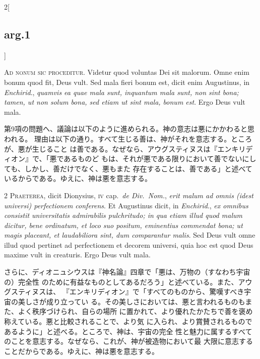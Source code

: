 \documentclass[paper=a4paper,fontsize=10pt,jafontsize=9pt,titlepage]{jlreq}
\begin{document}
\begin{paracol}{2}[\subsection{arg.1}]


{\huge A}{\scshape d nonum sic proceditur}. Videtur quod
voluntas Dei sit malorum. Omne enim bonum quod fit, Deus vult. Sed mala
fieri bonum est, dicit enim Augustinus, in {\itshape Enchirid}., {\itshape quamvis ea quae
mala sunt, inquantum mala sunt, non sint bona; tamen, ut non solum bona,
sed etiam ut sint mala, bonum est}. Ergo Deus vult mala.

\switchcolumn

第9項の問題へ、議論は以下のように進められる。神の意志は悪にかかわると思われる。
理由は以下の通り。すべて生じる善は、神がそれを意志する。ところが、悪が生じること
は善である。なぜなら、アウグスティヌスは『エンキリディオン』で、「悪であるものど
もは、それが悪である限りにおいて善でないにしても、しかし、善だけでなく、悪もまた
存在することは、善である」と述べているからである。ゆえに、神は悪を意志する。



{\scshape 2 Praeterea}, dicit Dionysius, {\scshape iv} cap.~{\itshape de
Div.~Nom.}, {\itshape erit malum ad omnis (idest universi) perfectionem
conferens}. Et Augustinus dicit, in {\itshape Enchirid}., {\itshape ex omnibus consistit
universitatis admirabilis pulchritudo; in qua etiam illud quod malum
dicitur, bene ordinatum, et loco suo positum, eminentius commendat bona;
ut magis placeant, et laudabiliora sint, dum comparantur malis}. Sed Deus
vult omne illud quod pertinet ad perfectionem et decorem universi, quia
hoc est quod Deus maxime vult in creaturis. Ergo Deus vult mala.

\switchcolumn

さらに、ディオニュシウスは『神名論』四章で「悪は、万物の（すなわち宇宙の）完全性
 のために有益なものとしてあるだろう」と述べている。また、アウグスティヌスは、
 『エンキリディオン』で「すべてのものから、驚嘆すべき宇宙の美しさが成り立ってい
 る。その美しさにおいては、悪と言われるものもまた、よく秩序づけられ、自らの場所
 に置かれて、より優れたかたちで善を褒め称えている。悪と比較されることで、より気
 に入られ、より賞賛されるものであるように」と述べる。ところで、神は、宇宙の完全
 性と魅力に属するすべてのことを意志する。なぜなら、これが、神が被造物において最
 大限に意志することだからである。ゆえに、神は悪を意志する。


\end{paracol}
\end{document}

